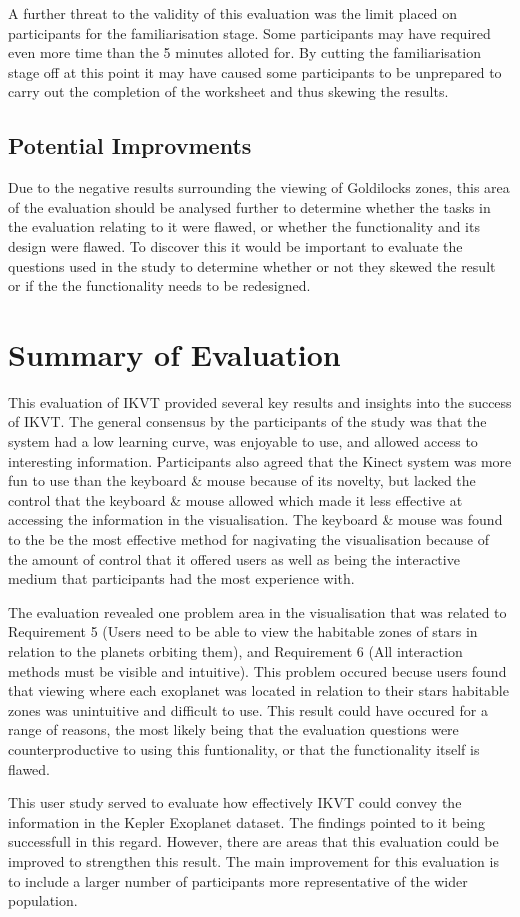 A further threat to the validity of this evaluation was the limit placed on
participants for the familiarisation stage. Some participants may have required
even more time than the 5 minutes alloted for. By cutting the familiarisation
stage off at this point it may have caused some participants to be unprepared
to carry out the completion of the worksheet and thus skewing the results.

\subsection{Potential Improvments}
Due to the negative results surrounding the viewing of Goldilocks zones,
this area of the evaluation should be analysed further to determine whether the
tasks in the evaluation relating to it were flawed, or whether the functionality
and its design were flawed. To discover this it would be important to evaluate
the questions used in the study to determine whether or not they skewed the result or if the the functionality needs to be
redesigned. 


\section{Summary of Evaluation}
This evaluation of IKVT provided several key results and insights into the
success of IKVT. The general consensus by the participants of the study
was that the system had a low learning curve, was enjoyable to use, and allowed
access to interesting information. Participants also agreed that the Kinect system was more fun to use than the keyboard \&
mouse because of its novelty, but lacked the control that the
keyboard \& mouse allowed which made it less effective at accessing the
information in the visualisation. The keyboard \& mouse was found to the be the
most effective method for nagivating the visualisation because of the amount of
control that it offered users as well as being the interactive medium that
participants had the most experience with.

The evaluation revealed one problem area in the visualisation that was related
to Requirement 5 (Users need to be able to view the habitable zones of stars in
relation to the planets orbiting them), and Requirement 6 (All interaction
methods must be visible and intuitive). This problem occured becuse users found that
viewing where each exoplanet was located in relation to their stars habitable
zones was unintuitive and difficult to use. This result could have occured for a
range of reasons, the most likely being that the evaluation questions were
counterproductive to using this funtionality, or that the functionality itself
is flawed.

This user study served to evaluate how effectively IKVT could convey the
information in the Kepler Exoplanet dataset. The findings pointed to it
being successfull in this regard. However, there are areas that this evaluation
could be improved to strengthen this result. The main improvement for this
evaluation is to include a larger number of participants more representative of
the wider population.



